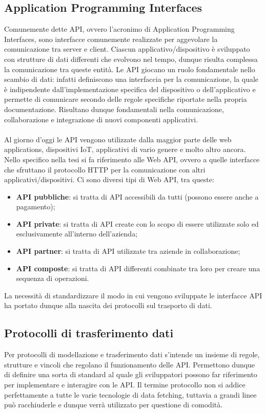 \subsection*{Application Programming Interfaces}
 Comunemente dette API, ovvero l'acronimo di Application Programming Interfaces, sono interfacce comunemente realizzate per aggevolare la comunicazione tra  server e client. Ciascun applicativo/dispositivo è sviluppato con strutture di dati differenti che evolvono nel tempo, dunque risulta complessa la comunicazione tra queste entità. Le API giocano un ruolo fondamentale nello scambio di dati: infatti definiscono una interfaccia per la comunicazione, la quale è indipendente dall'implementazione specifica del dispositivo o dell'applicativo e permette di comunicare secondo delle regole specifiche riportate nella propria documentazione. Risultano dunque fondamentali nella comunicazione, collaborazione e integrazione di nuovi componenti applicativi.\\ \\
 Al giorno d'oggi le API vengono utilizzate dalla maggior parte delle web applications, dispositivi IoT, applicativi di vario genere e molto altro ancora.
 Nello specifico nella tesi si fa riferimento alle Web API, ovvero a quelle interfacce che sfruttano il protocollo HTTP per la comunicazione con altri applicativi/dispositivi. Ci sono diversi tipi di Web API, tra queste:
 \begin{itemize}
   \item \textbf{API pubbliche}: si tratta di API accessibili da tutti (possono essere anche a pagamento);
   \item \textbf{API private}: si tratta di API create con lo scopo di essere utilizzate solo ed esclusivamente all'interno dell'azienda;
   \item \textbf{API partner}: si tratta di API utilizzate tra aziende in collaborazione;
   \item \textbf{API composte}: si tratta di API differenti combinate tra loro per creare una sequenza di operazioni.
 \end{itemize}
La necessità di standardizzare il modo in cui vengono sviluppate le interfacce API ha portato dunque alla nascita dei protocolli sul trasporto di dati.
\subsection*{Protocolli di trasferimento dati}
Per protocolli di modellazione e trasferimento dati s'intende un insieme di regole, strutture e vincoli che regolano il funzionamento delle API. Permettono dunque di definire una sorta di standard al quale gli sviluppatori possono far riferimento per implementare e interagire con le API. Il termine protocollo non si addice perfettamente a tutte le varie tecnologie di data fetching, tuttavia a grandi linee può racchiuderle e dunque verrà utilizzato per questione di comodità.
